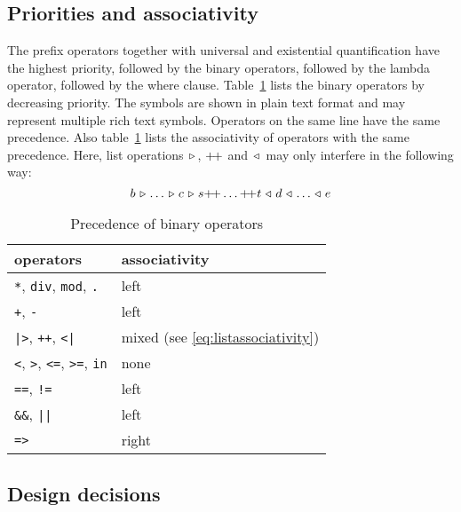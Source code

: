 \documentclass[a4paper,fleqn]{article}
\newcommand{\frm}[1]{\mbox{\ensuremath{#1}}}
\newcommand{\cons}{\ensuremath{\hspace{0.12em}\triangleright\hspace{0.08em}}}
\newcommand{\snoc}{\ensuremath{\hspace{0.08em}\triangleleft\hspace{0.12em}}}
\newcommand{\concat}{\frm{+\!+}}
\begin{document}
\subsection{Priorities and associativity}

The prefix operators together with universal and existential quantification
have the highest priority, followed by the binary operators, followed by the
lambda operator, followed by the where clause. Table~\ref{tab:precedence} lists
the binary operators by decreasing priority. The symbols are shown in plain
text format and may represent multiple rich text symbols. Operators on the same
line have the same precedence. Also table~\ref{tab:precedence} lists the
associativity of operators with the same precedence. Here, list operations
\frm{\cons}, \frm{\concat} and \frm{\snoc} may only interfere in the following
way:
\begin{equation}
b \cons \dots \cons c \cons s \concat \dots \concat t \snoc d \snoc \dots
\snoc e
\label{eq:listassociativity}
\end{equation}
 
\begin{table}[h!bt]
\centering
\begin{tabular}{|ll|}
\hline
operators                                           & associativity\\\hline
\verb+*+, \verb+div+, \verb+mod+, \verb+.+          & left\\
\verb-+-, \verb+-+                                  & left\\
\verb+|>+, \verb-++-, \verb+<|+                     & mixed
                                       (see \eqref{eq:listassociativity})\\
\verb+<+, \verb+>+, \verb+<=+, \verb+>=+, \verb+in+ & none\\
\verb+==+, \verb+!=+                                & left\\
\verb+&&+, \verb+||+                                & left\\
\verb+=>+                                           & right\\\hline
\end{tabular}
\caption{Precedence of binary operators}
\label{tab:precedence}
\end{table}

\subsection{Design decisions}
\end{document}
